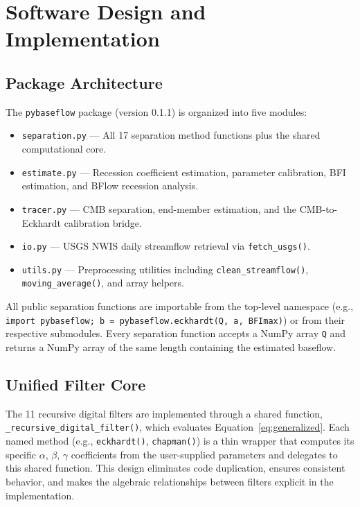 \documentclass[hydrology,article,submit,pdftex,moreauthors]{Definitions/mdpi}
\begin{document}
\section{Software Design and Implementation}
\label{sec:design}

\subsection{Package Architecture}
\label{sec:architecture}

The \texttt{pybaseflow} package (version 0.1.1) is organized into five modules:

\begin{itemize}[nosep]
\item \texttt{separation.py} --- All 17 separation method functions plus the shared computational core.
\item \texttt{estimate.py} --- Recession coefficient estimation, parameter calibration, BFI estimation, and BFlow recession analysis.
\item \texttt{tracer.py} --- CMB separation, end-member estimation, and the CMB-to-Eckhardt calibration bridge.
\item \texttt{io.py} --- USGS NWIS daily streamflow retrieval via \texttt{fetch\_usgs()}.
\item \texttt{utils.py} --- Preprocessing utilities including \texttt{clean\_streamflow()}, \texttt{moving\_average()}, and array helpers.
\end{itemize}

All public separation functions are importable from the top-level namespace (e.g., \texttt{import pybaseflow; b = pybaseflow.eckhardt(Q, a, BFImax)}) or from their respective submodules. Every separation function accepts a NumPy array \texttt{Q} and returns a NumPy array of the same length containing the estimated baseflow.

\subsection{Unified Filter Core}
\label{sec:filter_core}

The 11 recursive digital filters are implemented through a shared function, \texttt{\_recursive\_digital\_filter()}, which evaluates Equation~\ref{eq:generalized}. Each named method (e.g., \texttt{eckhardt()}, \texttt{chapman()}) is a thin wrapper that computes its specific $\alpha$, $\beta$, $\gamma$ coefficients from the user-supplied parameters and delegates to this shared function. This design eliminates code duplication, ensures consistent behavior, and makes the algebraic relationships between filters explicit in the implementation.
\end{document}
